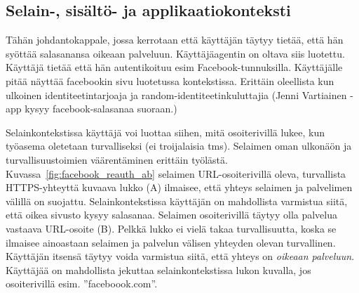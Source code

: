 \documentclass[finnish,gradu]{tktltiki}
\begin{document}




  \subsection{Selain-, sisältö- ja applikaatiokonteksti} %
  \label{sub:selainkonteksti_vs_applikaatiokonteksti}

  Tähän johdantokappale, jossa kerrotaan että käyttäjän täytyy tietää, että hän syöttää salasanansa oikeaan palveluun. Käyttäjäagentin on oltava siis luotettu. Käyttäjä tietää että hän autentikoituu esim Facebook-tunnuksilla. Käyttäjälle pitää näyttää facebookin sivu luotetussa kontekstissa. Erittäin oleellista kun ulkoinen identiteetintarjoaja ja random-identiteetinkuluttajia (Jenni Vartiainen -app kysyy facebook-salasanaa suoraan.)

  Selainkontekstissa käyttäjä voi luottaa siihen, mitä osoiterivillä lukee, kun työasema oletetaan turvalliseksi (ei troijalaisia tms). Selaimen oman ulkonäön ja turvallisuustoimien väärentäminen erittäin työlästä. Kuvassa~\ref{fig:facebook_reauth_ab} selaimen URL-osoiterivillä oleva, turvallista HTTPS-yhteyttä kuvaava lukko (A) ilmaisee, että yhteys selaimen ja palvelimen välillä on suojattu. Selainkontekstissa käyttäjän on mahdollista varmistua siitä, että oikea sivusto kysyy salasanaa. Selaimen osoiterivillä täytyy olla palvelua vastaava URL-osoite (B). Pelkkä lukko ei vielä takaa turvallisuutta, koska se ilmaisee ainoastaan selaimen ja palvelun välisen yhteyden olevan turvallinen. Käyttäjän itsensä täytyy voida varmistua siitä, että yhteys on \emph{oikeaan palveluun}. Käyttäjää on mahdollista jekuttaa selainkontekstissa lukon kuvalla, jos osoiterivillä esim. ''faceboook.com''.
\end{document}
